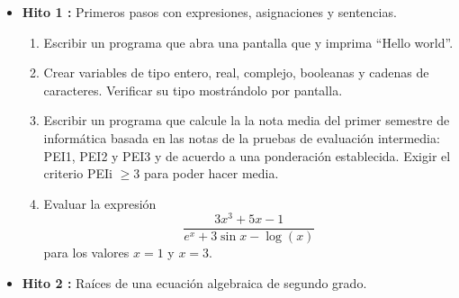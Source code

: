 \documentclass[12pt,spanish]{article}
\begin{document}
\begin{itemize}
	
	
\vspace{1cm}
\item {\bf Hito 1 :} Primeros pasos con expresiones, asignaciones y sentencias. 
\begin{enumerate} 
\item Escribir un programa  que abra una pantalla que y imprima ``Hello world''. 
\item Crear variables de tipo entero, real, complejo, booleanas y
cadenas de caracteres. Verificar su tipo mostrándolo por pantalla. 
\item Escribir un programa  que calcule la la nota media del primer 
semestre de informática basada en las notas de la pruebas de evaluación intermedia: PEI1, PEI2 y PEI3
y de acuerdo a una ponderación establecida. Exigir el criterio  PEIi $ \ge 3$ para poder hacer media. 
\item Evaluar la expresión 
$$ \frac{ 3 x^3 + 5 x - 1 }{ e^x + 3 \sin x - \log(x) }
$$
para los valores $ x = 1 $ y $ x=3$.
\end{enumerate}
%
               
%  
%        
%


\vspace{1cm}
\item {\bf Hito 2 :}    Raíces de una ecuación algebraica de segundo grado. 


\end{itemize}
\end{document}
